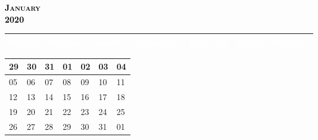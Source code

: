 \documentclass{article}
\newcommand{\daysize}{2.5cm}		%
\newcommand{\dw}{3.5cm}					%
\newcommand{\mkday}[1]{
  #1
  \vspace{\daysize}
}
\begin{document}
		\begin{center}
			\textsc{\LARGE \textbf{\textcolor{black}{
			January
			}}}\\ %
			\textsc{\large \textbf{\textcolor{black}{
			2020
			}}} %
		\end{center}

		\begin{center}
		\begin{tabular}{| p{\dw} | p{\dw} | p{\dw} | p{\dw} | p{\dw} | p{\dw} | p{\dw} |}
			\hline
			\cellcolor{bannercolor} \textcolor{white}{Sunday} &
			\cellcolor{bannercolor} \textcolor{white}{Monday} &
			\cellcolor{bannercolor} \textcolor{white}{Tuesday} &
			\cellcolor{bannercolor} \textcolor{white}{Wednesday} &
			\cellcolor{bannercolor} \textcolor{white}{Thursday} &
			\cellcolor{bannercolor} \textcolor{white}{Friday} &
			\cellcolor{bannercolor} \textcolor{white}{Saturday} \\
			\hline
		\end{tabular}

		\vspace{0.1cm}

		\begin{tabular}{| p{\dw} | p{\dw} | p{\dw} | p{\dw} | p{\dw} | p{\dw} | p{\dw} |}
\hline 
\cellcolor{weekendcolor}\mkday{
    29
} & 
\mkday{
    30
} &
\mkday{
    31
} &
\mkday{
    01
} &
\mkday{
    02
} &
\mkday{
    03
} &
\cellcolor{weekendcolor}\mkday{
    04
} 
\\
\hline 
\cellcolor{weekendcolor}\mkday{
    05
} & 
\mkday{
    06
} &
\mkday{
    07
} &
\mkday{
    08
} &
\mkday{
    09
} &
\mkday{
    10
} &
\cellcolor{weekendcolor}\mkday{
    11
} 
\\
\hline 
\cellcolor{weekendcolor}\mkday{
    12
} & 
\mkday{
    13
} &
\mkday{
    14
} &
\mkday{
    15
} &
\mkday{
    16
} &
\mkday{
    17
} &
\cellcolor{weekendcolor}\mkday{
    18
} 
\\
\hline 
\cellcolor{weekendcolor}\mkday{
    19
} & 
\mkday{
    20
} &
\mkday{
    21
} &
\mkday{
    22
} &
\mkday{
    23
} &
\mkday{
    24
} &
\cellcolor{weekendcolor}\mkday{
    25
} 
\\
\hline 
\cellcolor{weekendcolor}\mkday{
    26
} & 
\mkday{
    27
} &
\mkday{
    28
} &
\mkday{
    29
} &
\mkday{
    30
} &
\mkday{
    31
} &
\cellcolor{weekendcolor}\mkday{
    01
} 
\\
		\end{tabular}

		\end{center}
\end{document}

